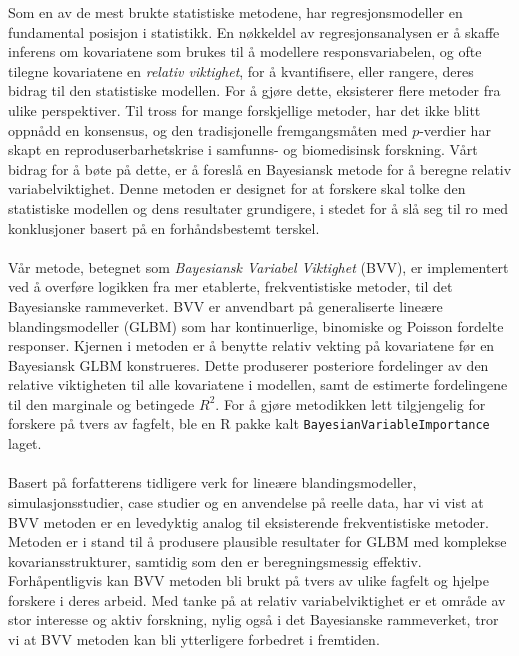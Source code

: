 Som en av de mest brukte statistiske metodene, har regresjonsmodeller en fundamental posisjon i statistikk. En nøkkeldel av regresjonsanalysen er å skaffe inferens om kovariatene som brukes til å modellere responsvariabelen, og ofte tilegne kovariatene en \textit{relativ viktighet}, for å kvantifisere, eller rangere, deres bidrag til den statistiske modellen. For å gjøre dette, eksisterer flere metoder fra ulike perspektiver. Til tross for mange forskjellige metoder, har det ikke blitt oppnådd en konsensus, og den tradisjonelle fremgangsmåten med $p$-verdier har skapt en reproduserbarhetskrise i samfunns- og biomedisinsk forskning. Vårt bidrag for å bøte på dette, er å foreslå en Bayesiansk metode for å beregne relativ variabelviktighet. Denne metoden er designet for at forskere skal tolke den statistiske modellen og dens resultater grundigere, i stedet for å slå seg til ro med konklusjoner basert på en forhåndsbestemt terskel.
\\
\\
Vår metode, betegnet som \textit{Bayesiansk Variabel Viktighet} (BVV), er implementert ved å overføre logikken fra mer etablerte, frekventistiske metoder, til det Bayesianske rammeverket. BVV er anvendbart på generaliserte lineære blandingsmodeller (GLBM) som har kontinuerlige, binomiske og Poisson fordelte responser. Kjernen i metoden er å benytte relativ vekting på kovariatene før en Bayesiansk GLBM konstrueres. Dette produserer posteriore fordelinger av den relative viktigheten til alle kovariatene i modellen, samt de estimerte fordelingene til den marginale og betingede $R^2$. For å gjøre metodikken lett tilgjengelig for forskere på tvers av fagfelt, ble en R pakke kalt \texttt{BayesianVariableImportance} laget.
\\
\\
Basert på forfatterens tidligere verk \citet{Arnstad:Relative_variable_importance_in_Bayesian_linear_mixed_models:2024} for lineære blandingsmodeller, simulasjonsstudier, case studier og en anvendelse på reelle data, har vi vist at BVV metoden er en levedyktig analog til eksisterende frekventistiske metoder. Metoden er i stand til å produsere plausible resultater for GLBM med komplekse kovariansstrukturer, samtidig som den er beregningsmessig effektiv. Forhåpentligvis kan BVV metoden bli brukt på tvers av ulike fagfelt og hjelpe forskere i deres arbeid. Med tanke på at relativ variabelviktighet er et område av stor interesse og aktiv forskning, nylig også i det Bayesianske rammeverket, tror vi at BVV metoden kan bli ytterligere forbedret i fremtiden.